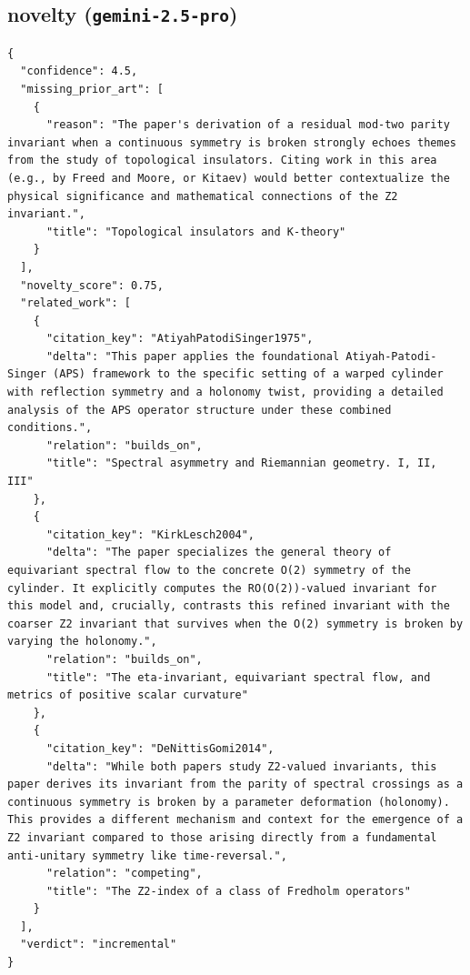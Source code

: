 \documentclass[11pt]{article}
\begin{document}
\subsection*{novelty (\texttt{gemini-2.5-pro})}
\begin{verbatim}
{
  "confidence": 4.5,
  "missing_prior_art": [
    {
      "reason": "The paper's derivation of a residual mod-two parity invariant when a continuous symmetry is broken strongly echoes themes from the study of topological insulators. Citing work in this area (e.g., by Freed and Moore, or Kitaev) would better contextualize the physical significance and mathematical connections of the Z2 invariant.",
      "title": "Topological insulators and K-theory"
    }
  ],
  "novelty_score": 0.75,
  "related_work": [
    {
      "citation_key": "AtiyahPatodiSinger1975",
      "delta": "This paper applies the foundational Atiyah-Patodi-Singer (APS) framework to the specific setting of a warped cylinder with reflection symmetry and a holonomy twist, providing a detailed analysis of the APS operator structure under these combined conditions.",
      "relation": "builds_on",
      "title": "Spectral asymmetry and Riemannian geometry. I, II, III"
    },
    {
      "citation_key": "KirkLesch2004",
      "delta": "The paper specializes the general theory of equivariant spectral flow to the concrete O(2) symmetry of the cylinder. It explicitly computes the RO(O(2))-valued invariant for this model and, crucially, contrasts this refined invariant with the coarser Z2 invariant that survives when the O(2) symmetry is broken by varying the holonomy.",
      "relation": "builds_on",
      "title": "The eta-invariant, equivariant spectral flow, and metrics of positive scalar curvature"
    },
    {
      "citation_key": "DeNittisGomi2014",
      "delta": "While both papers study Z2-valued invariants, this paper derives its invariant from the parity of spectral crossings as a continuous symmetry is broken by a parameter deformation (holonomy). This provides a different mechanism and context for the emergence of a Z2 invariant compared to those arising directly from a fundamental anti-unitary symmetry like time-reversal.",
      "relation": "competing",
      "title": "The Z2-index of a class of Fredholm operators"
    }
  ],
  "verdict": "incremental"
}
\end{verbatim}
\end{document}
